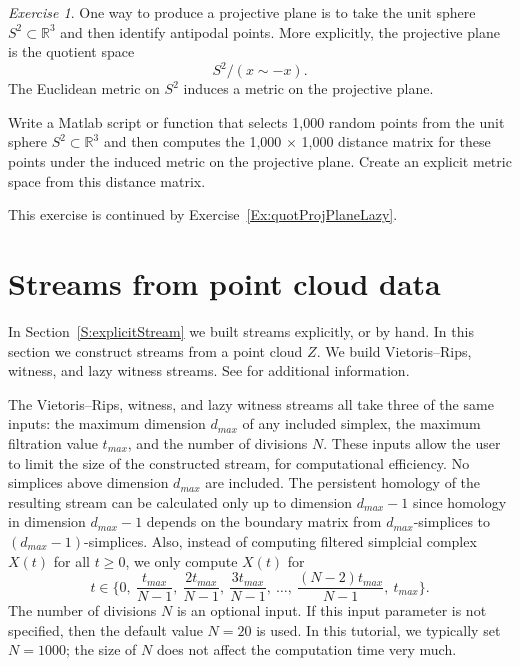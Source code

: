 \documentclass[amscd, amssymb, verbatim]{amsart}[12pt]
\theoremstyle{remark}
\newtheorem{exercise}{Exercise}
\theoremstyle{remark}
\theoremstyle{remark}
\newcommand{\R}{\mathbb{R}}
\begin{document}
\begin{exercise}\label{Ex:quotProjPlane}
One way to produce a projective plane is to take the unit sphere $S^2 \subset \R^3$ and then identify antipodal points. More explicitly, the projective plane is the quotient space 
$$S^2 / (x \sim -x).$$
The Euclidean metric on $S^2$ induces a metric on the projective plane.

Write a Matlab script or function that selects 1,000 random points from the unit sphere $S^2 \subset \R^3$ and then computes the 1,000 $\times$ 1,000 distance matrix for these points under the induced metric on the projective plane. Create an explicit metric space from this distance matrix. 

This exercise is continued by Exercise~\ref{Ex:quotProjPlaneLazy}. 
\end{exercise}




\section{Streams from point cloud data}\label{S:sfpc}

In Section~\ref{S:explicitStream} we built streams explicitly, or by hand. In this section we construct streams from a point cloud $Z$. We build Vietoris--Rips, witness, and lazy witness streams. See \citet{WitnessComplexes} for additional information. 

The Vietoris--Rips, witness, and lazy witness streams all take three of the same inputs: the maximum dimension $d_{max}$ of any included simplex, the maximum filtration value $t_{max}$, and the number of divisions $N$. These inputs allow the user to limit the size of the constructed stream, for computational efficiency. No simplices above dimension $d_{max}$ are included. The persistent homology of the resulting stream can be calculated only up to dimension $d_{max} - 1$ since homology in dimension $d_{max}-1$ depends on the boundary matrix from $d_{max}$-simplices to $(d_{max}-1)$-simplices. Also, instead of computing filtered simplcial complex $X(t)$ for all $t \geq 0$, we only compute $X(t)$ for
$$t \in \Biggl\{ 0,\ \frac{t_{max}}{N-1},\ \frac{2t_{max}}{N-1},\ \frac{3t_{max}}{N-1},\ \dots,\ \frac{(N-2)t_{max}}{N-1},\ t_{max} \Biggr\}.$$
The number of divisions $N$ is an optional input. If this input parameter is not specified, then the default value $N = 20$ is used. In this tutorial, we typically set $N=1000$; the size of $N$ does not affect the computation time very much.
\end{document}
